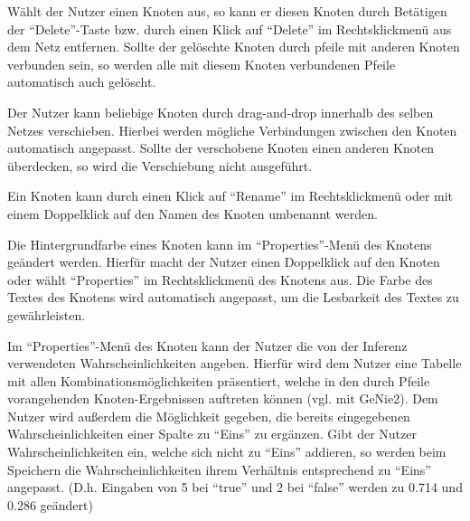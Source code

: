 \documentclass[parskip=full,11pt,twoside]{scrartcl}
\begin{document}
Wählt der Nutzer einen Knoten aus, so kann er diesen Knoten durch Betätigen der \enquote{Delete}-Taste bzw. durch einen Klick auf \enquote{Delete} im Rechtsklickmenü aus dem Netz entfernen. Sollte der gelöschte Knoten durch \gls{pfeil}e mit anderen Knoten verbunden sein, so werden alle mit diesem Knoten verbundenen Pfeile automatisch auch gelöscht.

Der Nutzer kann beliebige Knoten durch \gls{drag-and-drop} innerhalb des selben Netzes verschieben. Hierbei werden mögliche Verbindungen zwischen den Knoten automatisch angepasst. Sollte der verschobene Knoten einen anderen Knoten überdecken, so wird die Verschiebung nicht ausgeführt.

Ein Knoten kann durch einen Klick auf \enquote{Rename} im Rechtsklickmenü oder mit einem Doppelklick auf den Namen des Knoten umbenannt werden.

Die Hintergrundfarbe eines Knoten kann im \enquote{Properties}-Menü des Knotens geändert werden. Hierfür macht der Nutzer einen Doppelklick auf den Knoten oder wählt \enquote{Properties} im Rechtsklickmenü des Knotens aus. Die Farbe des Textes des Knotens wird automatisch angepasst, um die Lesbarkeit des Textes zu gewährleisten. %

Im \enquote{Properties}-Menü des Knoten kann der Nutzer die von der Inferenz verwendeten Wahrscheinlichkeiten angeben. Hierfür wird dem Nutzer eine Tabelle mit allen Kombinationsmöglichkeiten präsentiert, welche in den durch Pfeile vorangehenden Knoten-Ergebnissen auftreten können (vgl. mit GeNie2). Dem Nutzer wird außerdem die Möglichkeit gegeben, die bereits eingegebenen Wahrscheinlichkeiten einer Spalte zu \enquote{Eins} zu ergänzen. Gibt der Nutzer Wahrscheinlichkeiten ein, welche sich nicht zu \enquote{Eins} addieren, so werden beim Speichern die Wahrscheinlichkeiten ihrem Verhältnis entsprechend zu \enquote{Eins} angepasst. (D.h. Eingaben von 5 bei \enquote{true} und 2 bei \enquote{false} werden zu 0.714 und 0.286 geändert)
\end{document}

